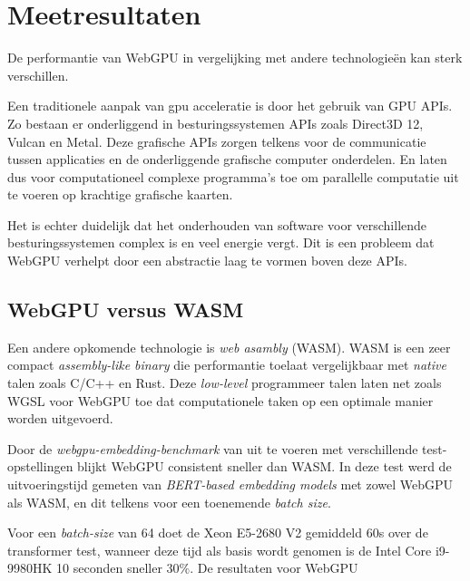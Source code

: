 \chapter{Meetresultaten}%
\label{ch:benchmarks}

De performantie van WebGPU in vergelijking met andere technologieën kan sterk verschillen. 

Een traditionele aanpak van gpu acceleratie is door het gebruik van GPU APIs. Zo bestaan er onderliggend in besturingssystemen APIs zoals Direct3D 12, Vulcan en Metal. Deze grafische APIs zorgen telkens voor de communicatie tussen applicaties en de onderliggende grafische computer onderdelen. En laten dus voor computationeel complexe programma's toe om parallelle computatie uit te voeren op krachtige grafische kaarten.

\bigbreak{}

Het is echter duidelijk dat het onderhouden van software voor verschillende besturingssystemen complex is en veel energie vergt. Dit is een probleem dat WebGPU verhelpt door een abstractie laag te vormen boven deze APIs. \autocite{Wallez2023} 

\break{}

\section{WebGPU versus WASM}

Een andere opkomende technologie is  \textit{web asambly} (WASM). WASM is een zeer compact \textit{assembly-like binary} die performantie toelaat vergelijkbaar met \textit{native} talen zoals C/C++ en Rust. \autocite{Steiner2023} Deze \textit{low-level} programmeer talen laten net zoals WGSL voor WebGPU toe dat computationele taken op een optimale manier worden uitgevoerd.

\bigbreak{}



Door de \textit{webgpu-embedding-benchmark} van \textcite{Lochner2024} uit te voeren met verschillende test-opstellingen blijkt WebGPU consistent sneller dan WASM. In deze test werd de uitvoeringstijd gemeten van \textit{BERT-based embedding models} met zowel WebGPU als WASM, en dit telkens voor een toenemende \textit{batch size}.

\bigbreak{}

Voor een \textit{batch-size} van 64 doet de Xeon E5-2680 V2 gemiddeld 60s over de transformer test, wanneer deze tijd als basis wordt genomen is de Intel Core i9-9980HK 10 seconden sneller \(30\%\). De resultaten voor WebGPU 


